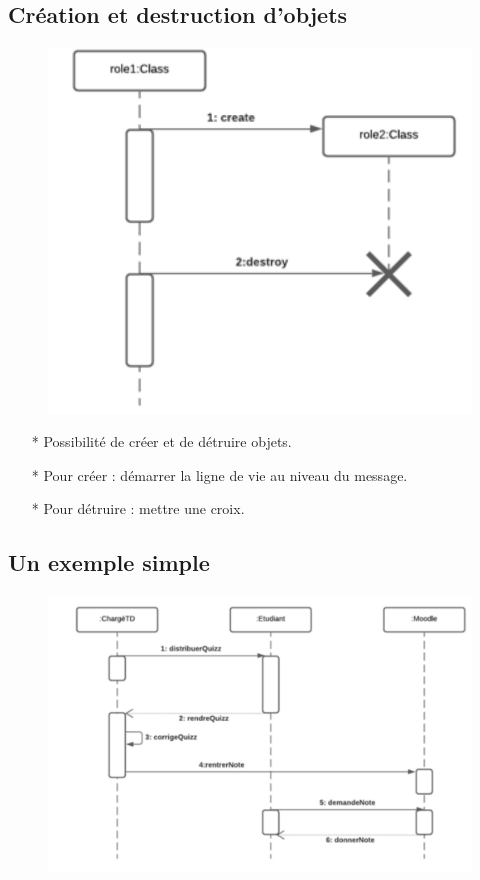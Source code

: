 \documentclass[12pt]{article}
\begin{document}
\subsection{Création et destruction d'objets}
	\begin{figure}[!hbtp]
	\centering
	\includegraphics[scale=0.75]{Capture2.PNG}
\end{figure}
\begin{itemize}
	\item[* ] Possibilité de créer et de détruire
	objets.
	\item[* ]  Pour créer : démarrer la ligne de vie au niveau du
	message.
	\item[* ] Pour détruire : mettre une croix.
\end{itemize}
\subsection{Un exemple simple}
	\begin{figure}[!hbtp]
	\centering
	\includegraphics[scale=0.75]{Capture3.PNG}
\end{figure}
\end{document}

